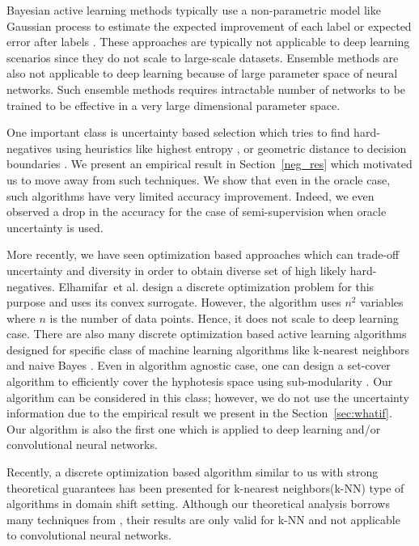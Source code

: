 \documentclass{article}
\begin{document}
Bayesian active learning methods typically use a non-parametric model like Gaussian process to estimate the expected improvement of each label \cite{kapoor2007active} or expected error after labels \cite{roy2001toward}. These approaches are typically not applicable to deep learning scenarios since they do not scale to large-scale datasets. Ensemble methods are also not applicable to deep learning because of large parameter space of neural networks. Such ensemble methods requires intractable number of networks to be trained to be effective in a very large dimensional parameter space.

One important class is uncertainty based selection \cite{tong2001support,lewissequential,joshi2009multi,li2013adaptive} which tries to find hard-negatives using heuristics like highest entropy \cite{joshi2009multi}, or geometric distance to decision boundaries \cite{tong2001support,brinker2003incorporating}. We present an empirical result in Section~\ref{neg_res} which motivated us to move away from such techniques. We show that even in the oracle case, such algorithms have very limited accuracy improvement. Indeed, we even observed a drop in the accuracy for the case of semi-supervision when oracle uncertainty is used. 

More recently, we have seen optimization based approaches which can trade-off uncertainty and diversity in order to obtain diverse set of high likely hard-negatives. Elhamifar~et al.  \cite{elhamifar2013convex} design a discrete optimization problem for this purpose and uses its convex surrogate. However, the algorithm uses $n^2$ variables where $n$ is the number of data points. Hence, it does not scale to deep learning case. There are also many discrete optimization based active learning algorithms designed for specific class of machine learning algorithms like k-nearest neighbors and naive Bayes \cite{wei2015submodularity}. Even in algorithm agnostic case, one can design a set-cover algorithm to efficiently cover the hyphotesis space using sub-modularity \cite{guillory2010interactive, golovin2011adaptive}. Our algorithm can be considered in this class; however, we do not use the uncertainty information due to the empirical result we present in the Section~\ref{sec:whatif}. Our algorithm is also the first one which is applied to deep learning and/or convolutional neural networks.

Recently, a discrete optimization based algorithm \cite{BerlindU15} similar to us with strong theoretical guarantees has been presented for k-nearest neighbors(k-NN) type of algorithms in domain shift setting. Although our theoretical analysis borrows many techniques from \cite{BerlindU15}, their results are only valid for k-NN and not applicable to convolutional neural networks. 
\end{document}
